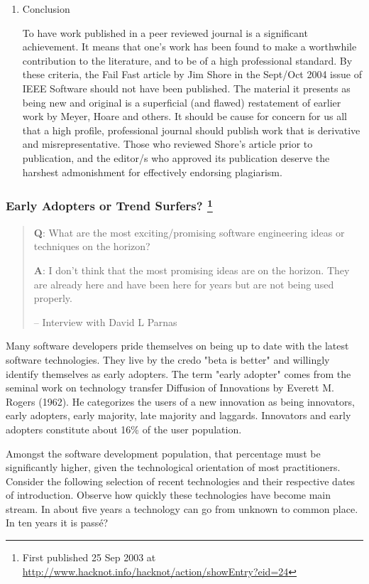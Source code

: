 \documentclass{article}
\begin{document}
\begin{enumerate}
\item Conclusion
\label{sec:orgheadline414}

To have work published in a peer reviewed journal is a significant
achievement. It means that one's work has been found to make a
worthwhile contribution to the literature, and to be of a high
professional standard. By these criteria, the Fail Fast article by Jim
Shore in the Sept/Oct 2004 issue of IEEE Software should not have been
published. The material it presents as being new and original is a
superficial (and flawed) restatement of earlier work by Meyer, Hoare and
others. It should be cause for concern for us all that a high profile,
professional journal should publish work that is derivative and
misrepresentative. Those who reviewed Shore's article prior to
publication, and the editor/s who approved its publication deserve the
harshest admonishment for effectively endorsing plagiarism.
\end{enumerate}

\subsubsection{Early Adopters or Trend Surfers? \footnote{First published 25 Sep 2003 at
\url{http://www.hacknot.info/hacknot/action/showEntry?eid=24}}}
\label{sec:orgheadline416}

\begin{quote}
\textbf{Q}: What are the most exciting/promising software engineering ideas
or techniques on the horizon?

\textbf{A}: I don't think that the most promising ideas are on the horizon.
They are already here and have been here for years but are not being
used properly.

-- Interview with David L Parnas
\end{quote}

Many software developers pride themselves on being up to date with the
latest software technologies. They live by the credo "beta is better"
and willingly identify themselves as early adopters. The term "early
adopter" comes from the seminal work on technology transfer Diffusion of
Innovations by Everett M. Rogers (1962). He categorizes the users of a
new innovation as being innovators, early adopters, early majority, late
majority and laggards. Innovators and early adopters constitute about
16\% of the user population.

Amongst the software development population, that percentage must be
significantly higher, given the technological orientation of most
practitioners. Consider the following selection of recent technologies
and their respective dates of introduction. Observe how quickly these
technologies have become main stream. In about five years a technology
can go from unknown to common place. In ten years it is passé?
\end{document}
